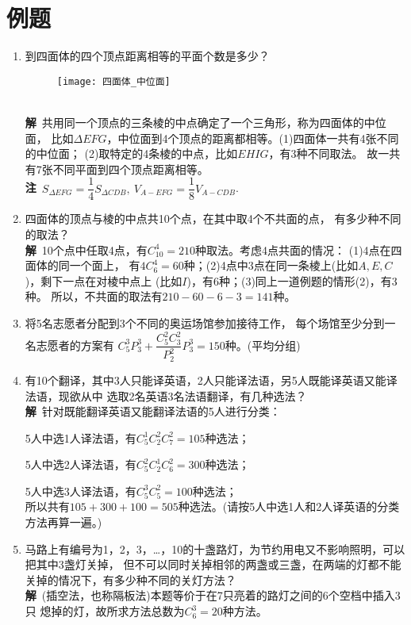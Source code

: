 \section{例题}
\begin{enumerate}[label={【\textbf{例\thechapter.\arabic*}】},
 leftmargin=\inteval{\myenumleftmargin}pt,
 itemsep=\inteval{\myenumitempsep}pt,
 itemindent=\inteval{\myenumitemindent}pt]
\item 到四面体的四个顶点距离相等的平面个数是多少？ 
\begin{figure}[h]
    \centering
    \texttt{[image: 四面体\_中位面]}
\end{figure} \\
\textbf{解}\ 共用同一个顶点的三条棱的中点确定了一个三角形，称为四面体的中位面，
比如$ \Delta EFG $，中位面到4个顶点的距离都相等。(1)四面体一共有4张不同的中位面；
(2)取特定的4条棱的中点，比如$ EHIG $，有3种不同取法。
故一共有7张不同平面到四个顶点距离相等。\\
\textbf{注}\ $ S_{\Delta EFG}=\dfrac{1}{4}S_{\Delta CDB},\ 
V_{A-EFG}=\dfrac{1}{8}V_{A-CDB} $. 

\item 四面体的顶点与棱的中点共10个点，在其中取4个不共面的点，
有多少种不同的取法？\\
\textbf{解}\ 10个点中任取4点，有$ C_{10}^4=210 $种取法。考虑4点共面的情况：
(1)4点在四面体的同一个面上，
有$ 4C_6^4=60 $种；(2)4点中3点在同一条棱上(比如$ A,E,C $)，剩下一点在对棱中点上
(比如$ I $)，有6种；(3)同上一道例题的情形(2)，有3种。
所以，不共面的取法有$ 210-60-6-3=141 $种。

\item 将5名志愿者分配到3个不同的奥运场馆参加接待工作，
每个场馆至少分到一名志愿者的方案有 $ 
C_5^3P_3^3+\dfrac{C_5^2C_3^2}{P_2^2}P_3^3=150 $种。(平均分组)

\item 有10个翻译，其中3人只能译英语，2人只能译法语，另5人既能译英语又能译法语，现欲从中
选取2名英语3名法语翻译，有几种选法？\\
\textbf{解}\ 针对既能翻译英语又能翻译法语的5人进行分类：

5人中选1人译法语，有$ C_5^1C_2^2C_7^2 = 105 $种选法；

5人中选2人译法语，有$ C_5^2C_2^1C_6^2 = 300 $种选法；

5人中选3人译法语，有$ C_5^3C_5^2= 100 $种选法； \\
所以共有$ 105 + 300 + 100 = 505 $种选法。(请按5人中选1人和2人译英语的分类方法再算一遍。)

\item 马路上有编号为1，2，3，…，10的十盏路灯，为节约用电又不影响照明，可以把其中3盏灯关掉，
但不可以同时关掉相邻的两盏或三盏，在两端的灯都不能关掉的情况下，有多少种不同的关灯方法？\\
\textbf{解}\ (插空法，也称隔板法)本题等价于在7只亮着的路灯之间的6个空档中插入3只
熄掉的灯，故所求方法总数为$  C_6^3= 20 $种方法。


\end{enumerate}
